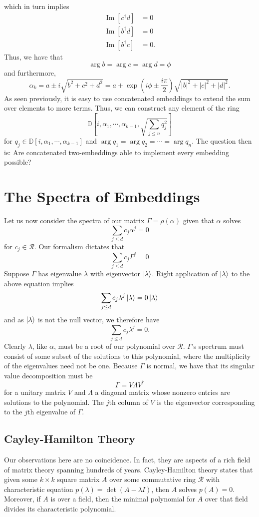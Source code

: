 \documentclass{article}
\theoremstyle{definition}
\theoremstyle{theorem}
\theoremstyle{remark}
\renewcommand{\Im}{\operatorname{Im}}
\begin{document}
	which in turn implies
	\begin{align*}
		\Im[c^\dagger d] &= 0\\
		\Im[b^\dagger d] &= 0\\
		\Im[b^\dagger c] &= 0.
	\end{align*}
	Thus, we have that
	\[
		\arg{b} = \arg{c} = \arg{d} = \phi
	\]
	and furthermore,
	\[
		\alpha_k = a\pm i\sqrt{b^2+c^2+d^2} = a + \exp\left(i\phi\pm \frac{i \pi}{2}\right)\sqrt{|b|^2+|c|^2+|d|^2}.
	\]
	As seen previously, it is easy to use concatenated embeddings to extend the sum over elements to more terms. Thus, we can construct any element of the ring
	\[
		\mathbb{D}\left[i,\alpha_1,\cdots,\alpha_{k-1},\sqrt{\sum_{j\leq n} q_j^2}\right]
	\]
	for $q_j\in\mathbb{D}\left[i,\alpha_1,\cdots,\alpha_{k-1}\right]$ and $\arg{q_1} = \arg{q_2} = \cdots = \arg{q_n}$. The question then is: Are concatenated two-embeddings able to implement every embedding possible?
	
	
	
	\section{The Spectra of Embeddings}
	Let us now consider the spectra of our matrix $\Gamma=\rho(\alpha)$ given that $\alpha$ solves
	\[
		\sum_{j\leq d} c_j \alpha^j = 0
	\]
	for $c_j\in\mathcal{R}$. Our formalism dictates that
	\[
		\sum_{j\leq d} c_j \Gamma^j = 0
	\]
	Suppose $\Gamma$ has eigenvalue $\lambda$ with eigenvector $\ket{\lambda}$. Right application of $\ket{\lambda}$ to the above equation implies
	\[
		\sum_{j\leq d} c_j \lambda^j \ket{\lambda} = 0 \ket{\lambda}
	\]
	and as $\ket{\lambda}$ is not the null vector, we therefore have
	\[
		\sum_{j\leq d} c_j \lambda^j = 0.
	\]
	Clearly $\lambda$, like $\alpha$, must be a root of our polynomial over $\mathcal{R}$. $\Gamma$'s spectrum must consist of some subset of the solutions to this polynomial, where the multiplicity of the eigenvalues need not be one. Because $\Gamma$ is normal, we have that its singular value decomposition must be
	\[
		\Gamma = V \Lambda V^\dagger
	\]
	for a unitary matrix $V$ and $\Lambda$ a diagonal matrix whose nonzero entries are solutions to the polynomial. The $j$th column of $V$ is the eigenvector corresponding to the $j$th eigenvalue of $\Gamma$.
	
	\subsection{Cayley-Hamilton Theory}
	Our observations here are no coincidence. In fact, they are aspects of a rich field of matrix theory spanning hundreds of years. Cayley-Hamilton theory states that given some $k\times k$ square matrix $A$ over some commutative ring $\mathcal{R}$ with characteristic equation $p(\lambda)=\det (A-\lambda I)$, then $A$ solves $p(A)=0$. Moreover, if $A$ is over a field, then the minimal polynomial for $A$ over that field divides its characteristic polynomial.
	
\end{document}
